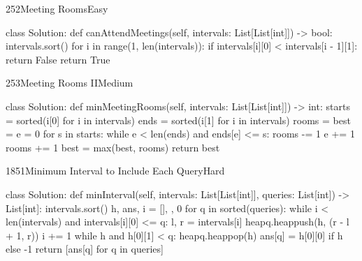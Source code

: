 \begin{problem}{252}{Meeting Rooms}{Easy}
\begin{code}
class Solution:
    def canAttendMeetings(self, intervals: List[List[int]]) -> bool:
        intervals.sort()
        for i in range(1, len(intervals)):
            if intervals[i][0] < intervals[i - 1][1]:
                return False
        return True
\end{code}
\end{problem}

\begin{problem}{253}{Meeting Rooms II}{Medium}
\begin{code}
class Solution:
    def minMeetingRooms(self, intervals: List[List[int]]) -> int:
        starts = sorted(i[0] for i in intervals)
        ends = sorted(i[1] for i in intervals)
        rooms = best = e = 0
        for s in starts:
            while e < len(ends) and ends[e] <= s:
                rooms -= 1
                e += 1
            rooms += 1
            best = max(best, rooms)
        return best
\end{code}
\end{problem}

\begin{problem}{1851}{Minimum Interval to Include Each Query}{Hard}
\begin{code}
class Solution:
    def minInterval(self, intervals: List[List[int]], queries: List[int]) -> List[int]:
        intervals.sort()
        h, ans, i = [], {}, 0
        for q in sorted(queries):
            while i < len(intervals) and intervals[i][0] <= q:
                l, r = intervals[i]
                heapq.heappush(h, (r - l + 1, r))
                i += 1
            while h and h[0][1] < q:
                heapq.heappop(h)
            ans[q] = h[0][0] if h else -1
        return [ans[q] for q in queries]
\end{code}
\end{problem}
